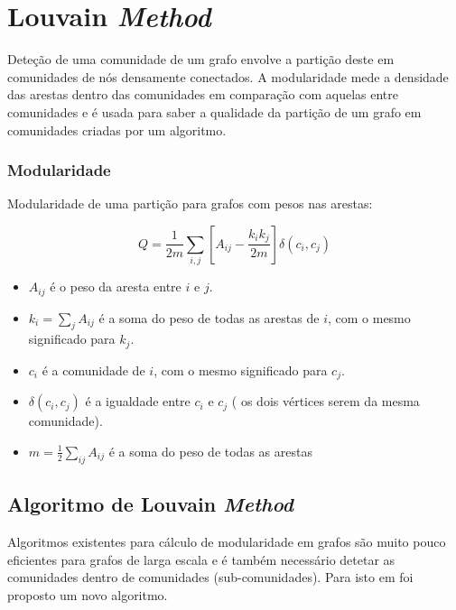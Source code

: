 
\renewcommand{\algorithmicrequire}{\textbf{Input: }}
\renewcommand{\algorithmicensure}{\textbf{Output: }}

\section{Louvain \textit{Method}}

Deteção de uma comunidade de um grafo envolve a partição deste em comunidades de nós densamente conectados. A modularidade mede a densidade das arestas dentro das comunidades em comparação com aquelas entre comunidades e é usada para saber a qualidade da partição de um grafo em comunidades criadas por um algoritmo. 

\subsubsection{Modularidade}

Modularidade de uma partição para grafos com pesos nas arestas:

\begin{equation}
Q = \frac{1}{2m} \sum_{i,j} [ A_{ij} - \frac{k_i k_j}{2m} ] \delta(c_i ,c_j)
\label{eq:MN}
\end{equation}


\begin{itemize}
	\item $A_{ij}$ é o peso da aresta entre $i$ e $j$.
	\item $k_i = \sum_j A_{ij}$ é a soma do peso de todas as arestas de $i$, com o mesmo significado para $k_j$.
	\item $c_i$ é a comunidade de $i$, com o mesmo significado para $c_j$.
	\item $\delta(c_i,c_j)$ é a igualdade entre $c_i$ e $c_j$ ( os dois vértices serem da mesma comunidade).
	\item $m = \frac{1}{2}\sum_{ij} A_{ij}$ é a soma do peso de todas as arestas %
\end{itemize}




\subsection{Algoritmo de Louvain \textit{Method}}
Algoritmos existentes para cálculo de modularidade em grafos são muito pouco eficientes para grafos de larga escala e é também necessário detetar as comunidades dentro de comunidades (sub-comunidades). Para isto em \cite{louvainDoc} foi proposto um novo algoritmo.

